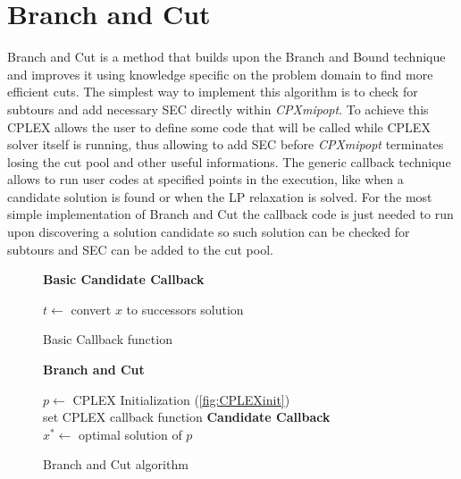 
\section{Branch and Cut}
Branch and Cut is a method that builds upon the Branch and Bound technique and improves it using knowledge specific on the problem domain to find more efficient cuts.
The simplest way to implement this algorithm is to check for subtours and add necessary SEC directly within \textit{CPXmipopt}.
To achieve this CPLEX allows the user to define some code that will be called while CPLEX solver itself is running, thus allowing to add SEC before \textit{CPXmipopt} terminates losing the cut pool and other useful informations.
The generic callback technique allows to run user codes at specified points in the execution, like when a candidate solution is found or when the LP relaxation is solved.
For the most simple implementation of Branch and Cut the callback code is just needed to run upon discovering a solution candidate so such solution can be checked for subtours and SEC can be added to the cut pool.

\begin{figure}[htbp]
	\textbf{Basic Candidate Callback} \\
	\begin{algorithm}[H]
		\vspace{2mm}
		$t \gets$ convert $x$ to successors solution\\
	\end{algorithm}
	\caption{Basic Callback function} \label{fig:callbackBase}
\end{figure}
\begin{figure}[htbp]
	\textbf{Branch and Cut} \\
	\begin{algorithm}[H]
		\vspace{2mm}
		$p \gets$ CPLEX Initialization (\ref{fig:CPLEXinit})\\
		set CPLEX callback function \textbf{Candidate Callback}\\
		$x^* \gets$ optimal solution of $p$\\
	\end{algorithm}
	\caption{Branch and Cut algorithm} \label{fig:branchAndCut}
\end{figure}

